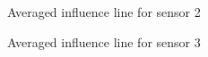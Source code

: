 \begin{figure}[H]
	\begin{adjustbox}{center}
		
	\end{adjustbox}
	\caption{Averaged influence line for sensor 2}
	\label{fig:infl_avg_sensor2_standard}
\end{figure}


\begin{figure}[H]
	\begin{adjustbox}{center}
		
	\end{adjustbox}
	\caption{Averaged influence line for sensor 3}
	\label{fig:infl_avg_sensor3_standard}
\end{figure}


